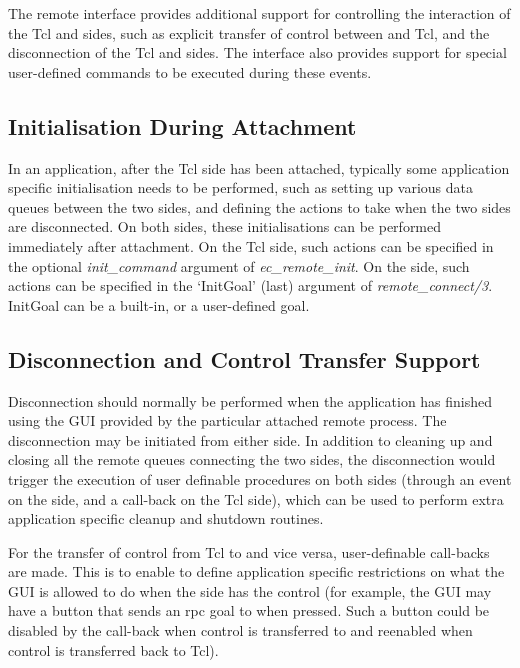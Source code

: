 The remote interface provides additional support for controlling the
interaction of the Tcl and {\eclipse} sides, such as explicit transfer of
control between {\eclipse} and Tcl, and the disconnection of the Tcl
and {\eclipse} sides. The interface also provides support for special
user-defined commands to be executed during these events.

\subsection{Initialisation During Attachment}


In an application, after the Tcl side has been attached, typically some
application specific initialisation needs to be performed, such as setting
up various data queues between the two sides, and defining the actions to
take when the two sides are disconnected. On both sides, these
initialisations can be performed immediately after attachment.  On the Tcl
side, such
actions can be specified in the optional {\it init_command} argument of
{\it ec_remote_init}. On the {\eclipse} side, such actions can be specified
in the `InitGoal' (last) argument of {\it remote_connect/3}. InitGoal can
be a built-in, or a user-defined goal.

\subsection{Disconnection and Control Transfer Support}

Disconnection should normally be performed when the {\eclipse} application
has finished using the GUI provided by the particular attached remote process.
The disconnection
may be initiated from either side. In addition to cleaning up and closing
all the remote queues connecting the two sides, the disconnection would
trigger the execution of user definable procedures on both sides (through an
event on the {\eclipse} side, and a call-back on the Tcl side), which can
be used to perform extra application specific cleanup and shutdown
routines. 

For the transfer of control from Tcl to {\eclipse} and vice versa, 
user-definable call-backs are made. This is to enable to define application
specific restrictions on what the GUI is allowed to do when the {\eclipse}
side has the control (for example, the GUI may have a button that sends an
rpc goal to {\eclipse} when pressed. Such a button could be disabled by the
call-back when control is transferred to {\eclipse} and reenabled when
control is transferred back to Tcl).

